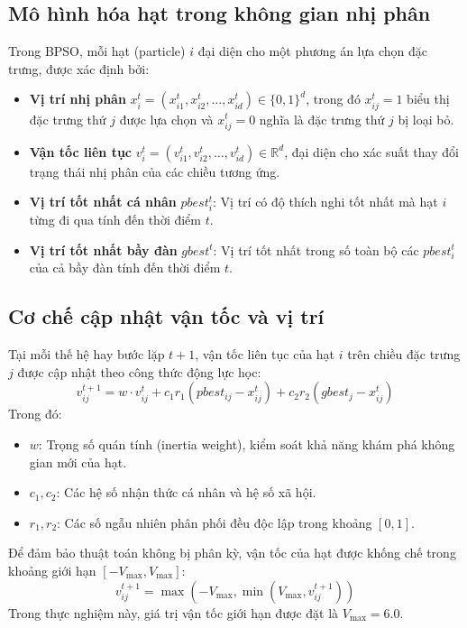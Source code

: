 \documentclass[a4paper,12pt]{report}
\begin{document}
\begin{itemize}
\subsection{Mô hình hóa hạt trong không gian nhị phân}
Trong BPSO, mỗi hạt (particle) $i$ đại diện cho một phương án lựa chọn đặc trưng, được xác định bởi:
\begin{itemize}
    \item \textbf{Vị trí nhị phân} $x_i^t = (x_{i1}^t, x_{i2}^t, \dots, x_{id}^t) \in \{0, 1\}^d$, trong đó $x_{ij}^t = 1$ biểu thị đặc trưng thứ $j$ được lựa chọn và $x_{ij}^t = 0$ nghĩa là đặc trưng thứ $j$ bị loại bỏ.
    \item \textbf{Vận tốc liên tục} $v_i^t = (v_{i1}^t, v_{i2}^t, \dots, v_{id}^t) \in \mathbb{R}^d$, đại diện cho xác suất thay đổi trạng thái nhị phân của các chiều tương ứng.
    \item \textbf{Vị trí tốt nhất cá nhân} $pbest_i^t$: Vị trí có độ thích nghi tốt nhất mà hạt $i$ từng đi qua tính đến thời điểm $t$.
    \item \textbf{Vị trí tốt nhất bầy đàn} $gbest^t$: Vị trí tốt nhất trong số toàn bộ các $pbest_i^t$ của cả bầy đàn tính đến thời điểm $t$.
\end{itemize}

\subsection{Cơ chế cập nhật vận tốc và vị trí}
Tại mỗi thế hệ hay bước lặp $t+1$, vận tốc liên tục của hạt $i$ trên chiều đặc trưng $j$ được cập nhật theo công thức động lực học:
\begin{equation}
    v_{ij}^{t+1} = w \cdot v_{ij}^t + c_1 r_1 (pbest_{ij} - x_{ij}^t) + c_2 r_2 (gbest_j - x_{ij}^t)
\end{equation}
Trong đó:
\begin{itemize}
    \item $w$: Trọng số quán tính (inertia weight), kiểm soát khả năng khám phá không gian mới của hạt.
    \item $c_1, c_2$: Các hệ số nhận thức cá nhân và hệ số xã hội.
    \item $r_1, r_2$: Các số ngẫu nhiên phân phối đều độc lập trong khoảng $[0, 1]$.
\end{itemize}

Để đảm bảo thuật toán không bị phân kỳ, vận tốc của hạt được khống chế trong khoảng giới hạn $[-V_{\max}, V_{\max}]$:
\begin{equation}
    v_{ij}^{t+1} = \max(-V_{\max}, \min(V_{\max}, v_{ij}^{t+1}))
\end{equation}
Trong thực nghiệm này, giá trị vận tốc giới hạn được đặt là $V_{\max} = 6.0$.


\end{itemize}
\end{document}
